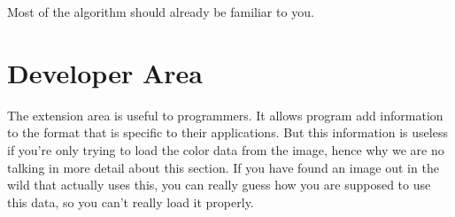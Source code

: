 \begin{refsection}
\begin{algorithm}[H]
\begin{algorithmic}[1]


            \EndIf


              \process


            \EndRepeatn

          \Else



              \EndIf

              \process


            \EndRepeatn

          \EndIf
        \Else


          \EndIf

          \process


        \EndIf
      \EndWhile
    \end{algorithmic}
  \end{algorithm}

  Most of the algorithm should already be familiar to you.

  \section{Developer Area}

  The extension area is useful to programmers. It allows program add
  information to the \tga format that is specific to their
  applications. But this information is useless if you're only trying
  to load the color data from the \tga image, hence why we are no
  talking in more detail about this section. If you have found an
  \tga image out in the wild that actually uses this, you can really
  guess how you are supposed to use this data, so you can't really
  load it properly.


\end{refsection}

